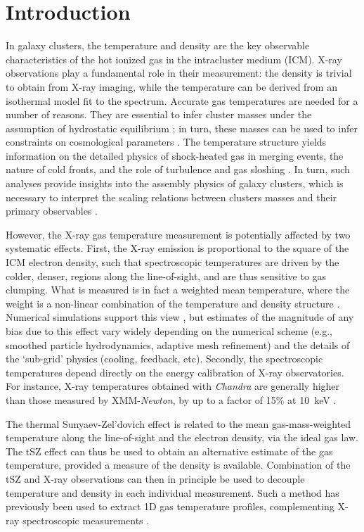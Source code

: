 \documentclass[twocolumn,traditabstract]{aa}
\begin{document}
\section{Introduction}\label{sec:Introduction}
In galaxy clusters, the temperature and density are the key observable characteristics of the hot ionized gas in the intracluster medium (ICM). X-ray observations play a fundamental role in their measurement: the density is trivial to obtain from X-ray imaging, while the temperature can be derived from an isothermal model fit to the spectrum. Accurate gas temperatures are needed for a number of reasons. They are essential to infer cluster masses under the assumption of hydrostatic equilibrium \citep{Sarazin1988}; in turn, these masses can be used to infer constraints on cosmological parameters \citep[e.g.,][]{Allen2011}. The temperature structure yields information on the detailed physics of shock-heated gas in merging events, the nature of cold fronts, and the role of turbulence and gas sloshing \citep[see, e.g.,][for a review]{mar07}. In turn, such analyses provide insights into the assembly physics of galaxy clusters, which is necessary to interpret the scaling relations between clusters masses and their primary observables \citep{Khedekar2013}.

However, the X-ray gas temperature measurement is potentially affected by two systematic effects. First, the X-ray emission is proportional to the square of the ICM electron density, such that spectroscopic temperatures are driven by the colder, denser, regions along the line-of-sight, and are thus sensitive to gas clumping. What is measured is in fact a weighted mean temperature, where the weight is a non-linear combination of the temperature and density structure \citep[see, e.g.,][]{maz04,vik06b}. Numerical simulations support this view \citep[e.g.,][]{Nagai2007,ras14}, but estimates of the magnitude of any bias due to this effect vary widely depending on the numerical scheme (e.g., smoothed particle hydrodynamics, adaptive mesh refinement) and the details of the `sub-grid' physics (cooling, feedback, etc). Secondly, the spectroscopic temperatures depend directly on the energy calibration of X-ray observatories. For instance, X-ray temperatures obtained with \textit{Chandra} are generally higher than those measured by XMM-\textit{Newton}, by up to a factor of 15\% at 10~keV \citep[e.g.,][]{Mahdavi2013}.

The thermal Sunyaev-Zel'dovich \citep[tSZ,][]{Sunyaev1972} effect is related to the mean gas-mass-weighted temperature along the line-of-sight and the electron density, via the ideal gas law. The tSZ effect can thus be used to obtain an alternative estimate of the gas temperature, provided a measure of the density is available. Combination of the tSZ and X-ray observations can then in principle be used to decouple temperature and density in each individual measurement. Such a method has previously been used to extract 1D gas temperature profiles, complementing X-ray spectroscopic measurements \citep[e.g.,][]{Pointecouteau2002,Kitayama2004,Nord2009,Basu2010,Eckert2013,Ruppin2016}.
\end{document}
